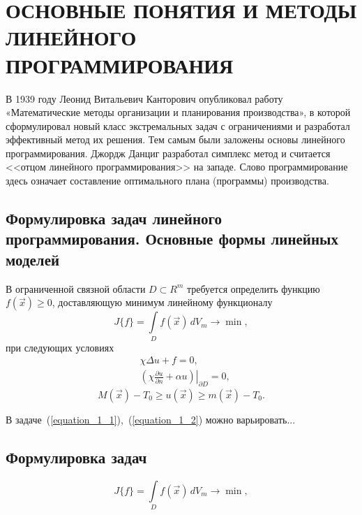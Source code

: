 \section{ОСНОВНЫЕ ПОНЯТИЯ И МЕТОДЫ ЛИНЕЙНОГО ПРОГРАММИРОВАНИЯ}

В 1939 году Леонид Витальевич Канторович опубликовал работу «Математические методы организации и планирования производства», в которой сформулировал новый класс экстремальных задач с ограничениями и разработал эффективный метод их решения. Тем самым были заложены основы линейного программирования. Джордж Данциг разработал симплекс метод и считается <<отцом линейного программирования>> на западе. Слово программирование здесь означает составление оптимального плана (программы) производства.

\subsection{Формулировка задач линейного программирования. Основные формы линейных моделей }

В ограниченной связной области $D{\subset}R^m$ требуется определить функцию $f(\vec x)\! \geqslant\! 0$, доставляющую минимум линейному функционалу
\begin{equation}
\label{equation_1_1}
	J\{f\} = \int\limits_D f(\vec x)\,dV_m \to \min,
\end{equation}
при следующих условиях
\begin{equation}
\label{equation_1_2}
	\begin{split}
		&\chi\Delta u + f = 0,\\
		&\left.\left(\chi\frac{\partial u}{\partial n} + \alpha u\right)\right|_{{\partial}D} = 0,
	\end{split}
\end{equation}
\begin{equation}
\label{equation_1_3}
	M(\vec x) - T_0 \geqslant u(\vec x) \geqslant m(\vec x) - T_0.
\end{equation}


В задаче~(\ref{equation_1_1}),~(\ref{equation_1_2}) можно варьировать...

\subsection{Формулировка задач}

\begin{equation}
\label{equation_1_4}
	J\{f\} = \int\limits_D f(\vec x)\,dV_m \to \min,
\end{equation}

